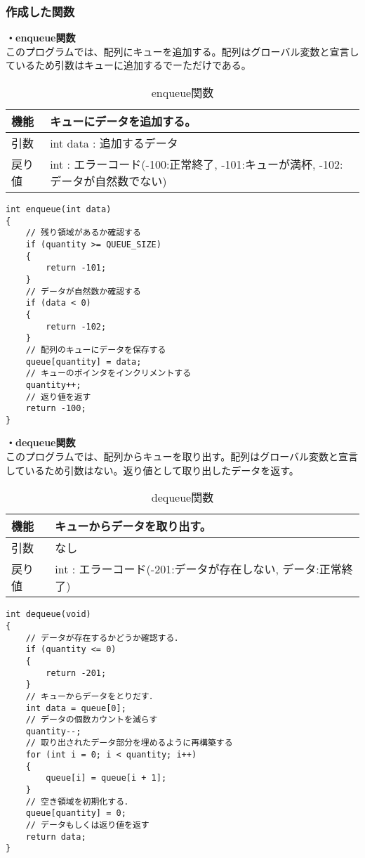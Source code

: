 \documentclass[dvipdfmx]{jsarticle}
\begin{document}
\subsubsection{作成した関数}
\textbf{・enqueue関数}\\
このプログラムでは、配列にキューを追加する。配列はグローバル変数と宣言しているため引数はキューに追加するでーただけである。
\begin{table}[ht]
  \centering
  \caption{enqueue関数}
  \begin{tabular}{|p{5cm}|p{10cm}|}
    \hline
    機能  & キューにデータを追加する。                                      \\
    \hline
    引数  & int data : 追加するデータ \\
    \hline
    戻り値 & int : エラーコード(-100:正常終了, -101:キューが満杯, -102:データが自然数でない) \\
    \hline
  \end{tabular}
  \label{tab:enqueue_func}
\end{table}
\begin{lstlisting}[caption={enqueue関数}, label={lst:enqueue_func}]
int enqueue(int data)
{
    // 残り領域があるか確認する
    if (quantity >= QUEUE_SIZE)
    {
        return -101;
    }
    // データが自然数か確認する
    if (data < 0)
    {
        return -102;
    }
    // 配列のキューにデータを保存する
    queue[quantity] = data;
    // キューのポインタをインクリメントする
    quantity++;
    // 返り値を返す
    return -100;
}
\end{lstlisting}
\textbf{・dequeue関数}\\
このプログラムでは、配列からキューを取り出す。配列はグローバル変数と宣言しているため引数はない。返り値として取り出したデータを返す。
\begin{table}[ht]
  \centering
  \caption{dequeue関数}
  \begin{tabular}{|p{5cm}|p{10cm}|}
    \hline
    機能  & キューからデータを取り出す。                                      \\
    \hline
    引数  & なし \\
    \hline
    戻り値 & int : エラーコード(-201:データが存在しない, データ:正常終了) \\
    \hline
  \end{tabular}
  \label{tab:dequeue_func}
\end{table}
\begin{lstlisting}[caption={dequeue関数}, label={lst:dequeue_func}]
int dequeue(void)
{
    // データが存在するかどうか確認する．
    if (quantity <= 0)
    {
        return -201;
    }
    // キューからデータをとりだす．
    int data = queue[0];
    // データの個数カウントを減らす
    quantity--;
    // 取り出されたデータ部分を埋めるように再構築する
    for (int i = 0; i < quantity; i++)
    {
        queue[i] = queue[i + 1];
    }
    // 空き領域を初期化する．
    queue[quantity] = 0;
    // データもしくは返り値を返す
    return data;
}
\end{lstlisting}
\end{document}

